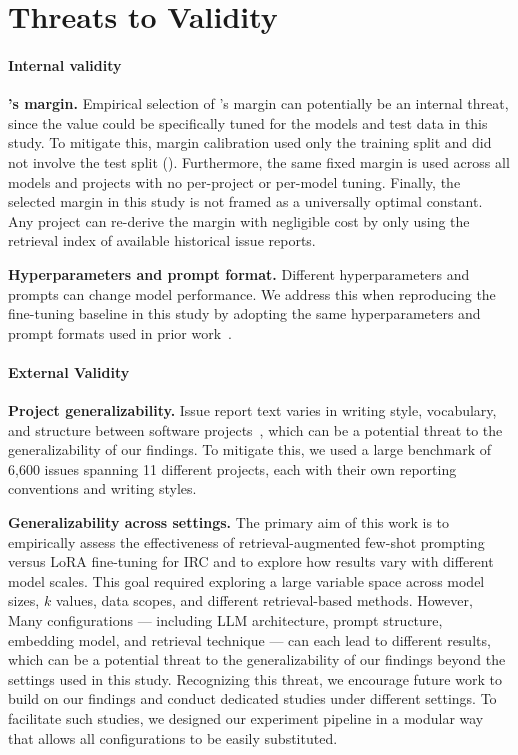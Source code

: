 
\section{Threats to Validity}
\label{sec:threats}
\paragraph{Internal validity} 

\textbf{\bragtag's margin.} Empirical selection of \bragtag's margin can potentially be an internal threat, since the value could be specifically tuned for the models and test data in this study. To mitigate this, margin calibration used only the training split and did not involve the test split (). Furthermore, the same fixed margin is used across all models and projects with no per-project or per-model tuning. Finally, the selected margin in this study is not framed as a universally optimal constant. Any project can re-derive the margin with negligible cost by only using the retrieval index of available historical issue reports.

\textbf{Hyperparameters and prompt format.} Different hyperparameters and prompts can change model performance. We address this when reproducing the fine-tuning baseline in this study by adopting the same hyperparameters and prompt formats used in prior work~\cite{heo2025study,aracena2025applying}. 



\paragraph{External Validity}
\textbf{Project generalizability.} Issue report text varies in writing style, vocabulary, and structure between software projects~\cite{akhavan2026linkanchorautonomousllmbasedagent}, which can be a potential threat to the generalizability of our findings. To mitigate this, we used a large benchmark of 6{,}600 issues spanning 11 different projects, each with their own reporting conventions and writing styles.


\textbf{Generalizability across settings.} The primary aim of this work is to empirically assess the effectiveness of retrieval-augmented few-shot prompting versus LoRA fine-tuning for IRC and to explore how results vary with different model scales. This goal required exploring a large variable space across model sizes, $k$ values, data scopes, and different retrieval-based methods. However, Many configurations --- including LLM architecture, prompt structure, embedding model, and retrieval technique --- can each lead to different results, which can be a potential threat to the generalizability of our findings beyond the settings used in this study. Recognizing this threat, we encourage future work to build on our findings and conduct dedicated studies under different settings. To facilitate such studies, we designed our experiment pipeline in a modular way that allows all configurations to be easily substituted.




